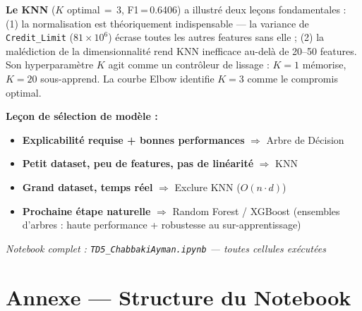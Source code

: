 \documentclass[12pt,a4paper]{article}
\newcommand{\feature}[1]{\texttt{\small #1}}
\begin{document}
\textbf{Le KNN} ($K$ optimal\,$=\,3$, F1\,=\,0.6406) a illustré deux leçons fondamentales :
(1) la normalisation est théoriquement indispensable — la variance de \feature{Credit\_Limit}
($81\times10^6$) écrase toutes les autres features sans elle ; (2) la malédiction
de la dimensionnalité rend KNN inefficace au-delà de 20--50 features.
Son hyperparamètre $K$ agit comme un contrôleur de lissage : $K=1$ mémorise,
$K=20$ sous-apprend. La courbe Elbow identifie $K=3$ comme le compromis optimal.

\textbf{Leçon de sélection de modèle :}
\begin{itemize}[noitemsep]
  \item \textbf{Explicabilité requise + bonnes performances} $\Rightarrow$ Arbre de Décision
  \item \textbf{Petit dataset, peu de features, pas de linéarité} $\Rightarrow$ KNN
  \item \textbf{Grand dataset, temps réel} $\Rightarrow$ Exclure KNN ($O(n \cdot d)$)
  \item \textbf{Prochaine étape naturelle} $\Rightarrow$ Random Forest / XGBoost
        (ensembles d'arbres : haute performance + robustesse au sur-apprentissage)
\end{itemize}

\vspace{1cm}
\begin{center}
  \textit{Notebook complet : \texttt{TD5\_ChabbakiAyman.ipynb} — toutes cellules exécutées}
\end{center}

\newpage
\appendix
\section*{Annexe — Structure du Notebook}
\end{document}
